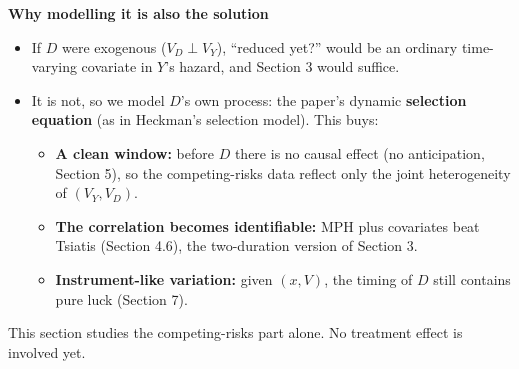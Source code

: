\documentclass[11pt]{article}
\newcommand{\1}{\mathbf{1}}
\begin{document}
\textbf{Why modelling it is also the solution}
\begin{itemize}
  \item If $D$ were exogenous ($V_D\perp V_Y$), ``reduced yet?'' would be an ordinary time-varying covariate in $Y$'s hazard, and Section 3 would suffice.
  \item It is not, so we model $D$'s own process: the paper's dynamic \textbf{selection equation} (as in Heckman's selection model). This buys:
    \begin{itemize}
      \item \textbf{A clean window:} before $D$ there is no causal effect (no anticipation, Section 5), so the competing-risks data reflect only the joint heterogeneity of $(V_Y,V_D)$.
      \item \textbf{The correlation becomes identifiable:} MPH plus covariates beat Tsiatis (Section 4.6), the two-duration version of Section 3.
      \item \textbf{Instrument-like variation:} given $(x,V)$, the timing of $D$ still contains pure luck (Section 7).
    \end{itemize}
\end{itemize}
This section studies the competing-risks part alone. No treatment effect is involved yet.
\end{document}
